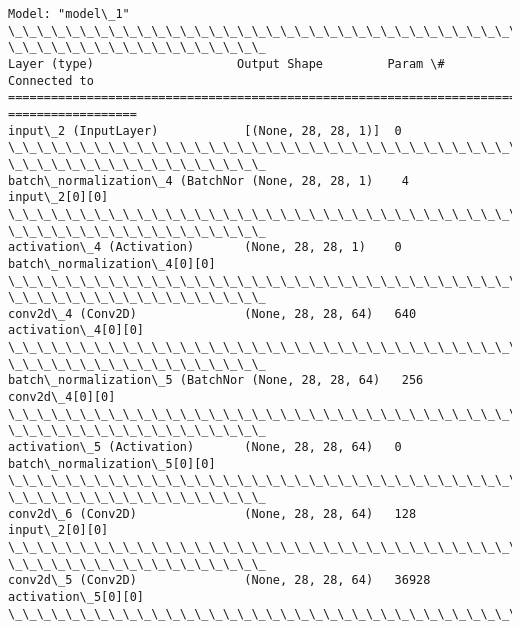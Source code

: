 \documentclass[11pt]{article}
\begin{document}
    \begin{Verbatim}[commandchars=\\\{\}]
Model: "model\_1"
\_\_\_\_\_\_\_\_\_\_\_\_\_\_\_\_\_\_\_\_\_\_\_\_\_\_\_\_\_\_\_\_\_\_\_\_\_\_\_\_\_\_\_\_\_\_\_\_\_\_\_\_\_\_\_\_\_\_\_\_\_\_\_\_\_\_\_\_\_\_\_\_\_\_\_\_\_\_\_\_
\_\_\_\_\_\_\_\_\_\_\_\_\_\_\_\_\_\_
Layer (type)                    Output Shape         Param \#     Connected to
================================================================================
==================
input\_2 (InputLayer)            [(None, 28, 28, 1)]  0
\_\_\_\_\_\_\_\_\_\_\_\_\_\_\_\_\_\_\_\_\_\_\_\_\_\_\_\_\_\_\_\_\_\_\_\_\_\_\_\_\_\_\_\_\_\_\_\_\_\_\_\_\_\_\_\_\_\_\_\_\_\_\_\_\_\_\_\_\_\_\_\_\_\_\_\_\_\_\_\_
\_\_\_\_\_\_\_\_\_\_\_\_\_\_\_\_\_\_
batch\_normalization\_4 (BatchNor (None, 28, 28, 1)    4           input\_2[0][0]
\_\_\_\_\_\_\_\_\_\_\_\_\_\_\_\_\_\_\_\_\_\_\_\_\_\_\_\_\_\_\_\_\_\_\_\_\_\_\_\_\_\_\_\_\_\_\_\_\_\_\_\_\_\_\_\_\_\_\_\_\_\_\_\_\_\_\_\_\_\_\_\_\_\_\_\_\_\_\_\_
\_\_\_\_\_\_\_\_\_\_\_\_\_\_\_\_\_\_
activation\_4 (Activation)       (None, 28, 28, 1)    0
batch\_normalization\_4[0][0]
\_\_\_\_\_\_\_\_\_\_\_\_\_\_\_\_\_\_\_\_\_\_\_\_\_\_\_\_\_\_\_\_\_\_\_\_\_\_\_\_\_\_\_\_\_\_\_\_\_\_\_\_\_\_\_\_\_\_\_\_\_\_\_\_\_\_\_\_\_\_\_\_\_\_\_\_\_\_\_\_
\_\_\_\_\_\_\_\_\_\_\_\_\_\_\_\_\_\_
conv2d\_4 (Conv2D)               (None, 28, 28, 64)   640
activation\_4[0][0]
\_\_\_\_\_\_\_\_\_\_\_\_\_\_\_\_\_\_\_\_\_\_\_\_\_\_\_\_\_\_\_\_\_\_\_\_\_\_\_\_\_\_\_\_\_\_\_\_\_\_\_\_\_\_\_\_\_\_\_\_\_\_\_\_\_\_\_\_\_\_\_\_\_\_\_\_\_\_\_\_
\_\_\_\_\_\_\_\_\_\_\_\_\_\_\_\_\_\_
batch\_normalization\_5 (BatchNor (None, 28, 28, 64)   256         conv2d\_4[0][0]
\_\_\_\_\_\_\_\_\_\_\_\_\_\_\_\_\_\_\_\_\_\_\_\_\_\_\_\_\_\_\_\_\_\_\_\_\_\_\_\_\_\_\_\_\_\_\_\_\_\_\_\_\_\_\_\_\_\_\_\_\_\_\_\_\_\_\_\_\_\_\_\_\_\_\_\_\_\_\_\_
\_\_\_\_\_\_\_\_\_\_\_\_\_\_\_\_\_\_
activation\_5 (Activation)       (None, 28, 28, 64)   0
batch\_normalization\_5[0][0]
\_\_\_\_\_\_\_\_\_\_\_\_\_\_\_\_\_\_\_\_\_\_\_\_\_\_\_\_\_\_\_\_\_\_\_\_\_\_\_\_\_\_\_\_\_\_\_\_\_\_\_\_\_\_\_\_\_\_\_\_\_\_\_\_\_\_\_\_\_\_\_\_\_\_\_\_\_\_\_\_
\_\_\_\_\_\_\_\_\_\_\_\_\_\_\_\_\_\_
conv2d\_6 (Conv2D)               (None, 28, 28, 64)   128         input\_2[0][0]
\_\_\_\_\_\_\_\_\_\_\_\_\_\_\_\_\_\_\_\_\_\_\_\_\_\_\_\_\_\_\_\_\_\_\_\_\_\_\_\_\_\_\_\_\_\_\_\_\_\_\_\_\_\_\_\_\_\_\_\_\_\_\_\_\_\_\_\_\_\_\_\_\_\_\_\_\_\_\_\_
\_\_\_\_\_\_\_\_\_\_\_\_\_\_\_\_\_\_
conv2d\_5 (Conv2D)               (None, 28, 28, 64)   36928
activation\_5[0][0]
\_\_\_\_\_\_\_\_\_\_\_\_\_\_\_\_\_\_\_\_\_\_\_\_\_\_\_\_\_\_\_\_\_\_\_\_\_\_\_\_\_\_\_\_\_\_\_\_\_\_\_\_\_\_\_\_\_\_\_\_\_\_\_\_\_\_\_\_\_\_\_\_\_\_\_\_\_\_\_\_

\end{Verbatim}
\end{document}

